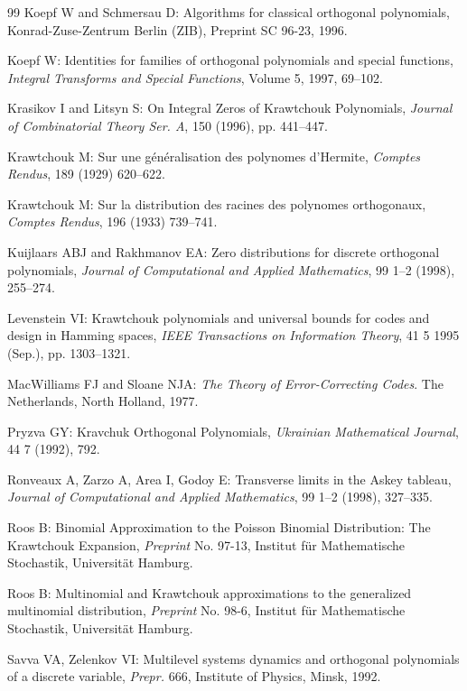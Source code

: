 \begin{thebibliography}{99}
 Koepf W and Schmersau D: Algorithms for classical orthogonal polynomials, Konrad-Zuse-Zentrum Berlin (ZIB), Preprint SC 96-23, 1996.

 Koepf W: Identities for families of orthogonal polynomials and special functions, \emph{Integral Transforms and Special Functions}, Volume 5, 1997, 69--102.

 Krasikov I and Litsyn S: On Integral Zeros of Krawtchouk Polynomials, \emph{Journal of Combinatorial Theory Ser. A}, 150 (1996), pp. 441--447.

 Krawtchouk M: Sur une g\'en\'eralisation des polynomes d'Hermite, \emph{Comptes Rendus}, 189 (1929) 620--622.

 Krawtchouk M: Sur la distribution des racines des polynomes orthogonaux, \emph{Comptes Rendus}, 196 (1933) 739--741.

 Kuijlaars ABJ and Rakhmanov EA: Zero distributions for discrete orthogonal polynomials, \emph{Journal of Computational and Applied Mathematics}, 99 1--2 (1998), 255--274.

 Levenstein VI: Krawtchouk polynomials and universal bounds for codes and design in Hamming spaces, \emph{IEEE Transactions on Information Theory}, 41 5 1995 (Sep.), pp. 1303--1321.

 MacWilliams FJ and Sloane NJA: \emph{The Theory of Error-Correcting Codes}. The Netherlands, North Holland, 1977.

 Pryzva GY: Kravchuk Orthogonal Polynomials, \emph{Ukrainian Mathematical Journal}, 44 7 (1992), 792.

 Ronveaux A, Zarzo A, Area I, Godoy E: Transverse limits in the Askey tableau, \emph{Journal of Computational and Applied Mathematics}, 99 1--2 (1998), 327--335.

 Roos B: Binomial Approximation to the Poisson Binomial Distribution: The Krawtchouk Expansion, \emph{Preprint} No. 97-13, Institut f\"ur Mathematische Stochastik, Universit\"at Hamburg.

 Roos B: Multinomial and Krawtchouk approximations to the generalized multinomial distribution, \emph{Preprint} No. 98-6, Institut f\"ur Mathematische Stochastik, Universit\"at Hamburg.

 Savva VA, Zelenkov VI: Multilevel systems dynamics and orthogonal polynomials of a discrete variable, \emph{Prepr.} 666, Institute of Physics, Minsk, 1992.


\end{thebibliography}
